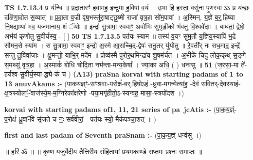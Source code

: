 \documentclass[17pt]{extarticle}
\begin{document}
                  \newline
                                \textbf{ TS 1.7.13.4} \newline
                  प्र य॑न्धि ॥ प्र॒दा॒तारꣳ॑ हवामह॒ इन्द्र॒मा ह॒विषा॑ व॒यं । उ॒भा हि हस्ता॒ वसु॑ना पृ॒णस्वा ऽऽ प्र य॑च्छ॒ दक्षि॑णा॒दोत स॒व्यात् ॥ प्र॒दा॒ता व॒ज्री वृ॑ष॒भस्तु॑रा॒षाट्छु॒ष्मी राजा॑ वृत्र॒हा सो॑म॒पावा᳚ । अ॒स्मिन्. य॒ज्ञे ब॒र्॒.हिष्या नि॒षद्याथा॑ भव॒ यज॑मानाय॒ शं ॅयोः ॥ इन्द्रः॑ सु॒त्रामा॒ स्ववाꣳ॒॒ अवो॑भिः सुमृडी॒को भ॑वतु वि॒श्ववे॑दाः । बाध॑तां॒ द्वेषो॒ अभ॑यं कृणोतु सु॒वीर्य॑स्य॒ - [ ] \textbf{  50} \newline
                  \newline
                                \textbf{ TS 1.7.13.5} \newline
                  पत॑यः स्याम ॥ तस्य॑ व॒यꣳ सु॑म॒तौ य॒ज्ञिय॒स्यापि॑ भ॒द्रे सौ॑मन॒से स्या॑म । स सु॒त्रामा॒ स्ववाꣳ॒॒ इन्द्रो॑ अ॒स्मे आ॒राच्चि॒द्-द्वेषः॑ सनु॒तर् यु॑योतु ॥ रे॒वती᳚र् नः सध॒माद॒ इन्द्रे॑ सन्तु तु॒विवा॑जाः । क्षु॒मन्तो॒ याभि॒र् मदे॑म ॥ प्रोष्व॑स्मै पुरोर॒थमिन्द्रा॑य शू॒षम॑र्चत । अ॒भीके॑ चिदु लोक॒कृथ् स॒ङ्गे स॒मथ्सु॑ वृत्र॒हा । अ॒स्माकं॑ बोधि चोदि॒ता नभ॑न्ता-मन्य॒केषां᳚ । ज्या॒का अधि॒ ( ) धन्व॑सु ॥ \textbf{  51} \newline
                  \newline
                      (ज॒रसा॒-मा ते॑-हर्यश्व-सु॒वीर्य॒स्या-द्ध्ये-कं॑ च )  \textbf{(A13)} \newline \newline
                \textbf{praSna korvai with starting padams of 1 to 13 anuvAkams :-} \newline
        (पा॒क॒य॒ज्ञ्ꣳ-सꣳश्र॑वाः-प॒रोक्षं॑-ब॒र्॒.हिषो॒ऽहं -ध्रु॒वा-मग॒न्मेत्या॑ह॒ -देव॑ सवितर्-दे॒वस्या॒हं-क्ष॒त्रस्योलꣳं॒-ॅवाज॑स्ये॒म-म॒ग्निरेका᳚क्षरेणो -पया॒मगृ॑हीतो॒ऽ-स्यन्वह॒ मासा॒-स्त्रयो॑दश ।) \newline

        \textbf{korvai with starting padams of1, 11, 21 series of pa~jcAtis :-} \newline
        (पा॒क॒य॒ज्ञ्ं-प॒रोक्षं॑-ध्रु॒वां-ॅवि सृ॑जते-च नः॒ सर्व॑वीरां॒ - पत॑यः स्यो॒-मैक॑पञ्चा॒शत् । ) \newline

        \textbf{first and last padam of Seventh praSnam :-} \newline
        (पा॒क॒य॒ज्ञ्ं-धन्व॑सु ।) \newline 

        
        ॥ हरि॑ ॐ ॥
॥ कृष्ण यजुर्वेदीय तैत्तिरीय संहितायां प्रथमकाण्डे सप्तमः प्रश्नः समाप्तः ॥ \newline
        \pagebreak
                \pagebreak
        
\end{document}
